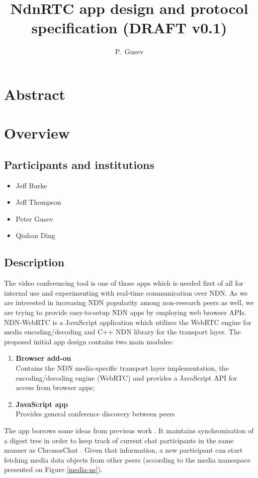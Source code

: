 \documentclass[12pt]{article}
\author{P.~Gusev}
\title{NdnRTC app design and protocol specification (DRAFT v0.1)}
\begin{document}
\maketitle
\newpage

\section*{Abstract}
\tableofcontents

\newpage
\section{Overview}
\subsection{Participants and institutions}
\begin{itemize}
\item Jeff Burke
\item Jeff Thompson
\item Peter Gusev
\item Qiuhan Ding
\end{itemize}

\subsection{Description}
The video conferencing tool is one of those apps which is needed first of all for internal use and experimenting with real-time communication over NDN. As we are interested in increasing NDN popularity among non-research peers as well, we are trying to provide easy-to-setup NDN apps by employing web browser APIs. NDN-WebRTC is a JavaScript application which utilizes the WebRTC engine for media encoding/decoding and C++ NDN library for the transport layer. The proposed initial app design contains two main modules: 
\begin{enumerate}
\item \textbf{Browser add-on} \\
Contains the NDN media-specific transport layer implementation, the encoding/decoding engine (WebRTC) and provides a JavaScript API for access from browser apps;
\item \textbf{JavaScript app} \\
Provides general conference discovery between peers
\end{enumerate}

The app borrows some ideas from previous work \cite{videoTR,ChronosTR}. It maintains synchronization of a digest tree in order to keep track of current chat participants in the same manner as ChronosChat \cite{ChronosTR}. Given that information, a new participant can start fetching media data objects from other peers (according to the media namespace presented on Figure \ref{media-ns}).
\end{document}
